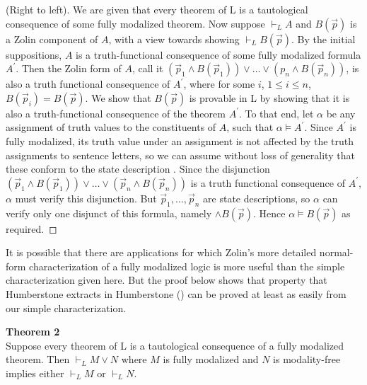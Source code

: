 \documentclass[
  10pt,
  letterpaper,
  DIV=11,
  numbers=noendperiod,
  twoside]{scrartcl}
\begin{document}
(Right to left). We are given that every theorem of L is a tautological
consequence of some fully modalized theorem. Now suppose \(\vdash_L A\)
and \(B(\vec{p})\) is a Zolin component of \(A\), with a view towards
showing \(\vdash_L B(\vec{p})\). By the initial suppositions, \(A\) is a
truth-functional consequence of some fully modalized formula
\(A^\prime\). Then the Zolin form of \(A\), call it
\((\vec{p}_1\wedge B(\vec{p}_1))\vee {\ldots}\vee (p_n\wedge B(\vec{p}_n))\),
is also a truth functional consequence of \(A^\prime\), where for some
\(i\), \(1\le i\le n\), \(B(\vec{p}_i)=B(\vec{p})\). We show that
\(B(\vec{p})\) is provable in L by showing that it is also a
truth-functional consequence of the theorem \(A^\prime\). To that end,
let \(\alpha\) be any assignment of truth values to the constituents of
\(A\), such that \(\alpha\models A^\prime\). Since \(A^\prime\) is fully
modalized, its truth value under an assignment is not affected by the
truth assignments to sentence letters, so we can assume without loss of
generality that these conform to the state description . Since the
disjunction
\((\vec{p}_1\wedge B(\vec{p}_1))\vee {\ldots}\vee (\vec{p}_n\wedge B(\vec{p}_n))\)
is a truth functional consequence of \(A^\prime\), \(\alpha\) must
verify this disjunction. But \(\vec{p}_1,{\ldots},\vec{p}_n\) are state
descriptions, so \(\alpha\) can verify only one disjunct of this
formula, namely \(\wedge B(\vec{p})\). Hence
\(\alpha\models B(\vec{p})\) as required.~◻

It is possible that there are applications for which Zolin's more
detailed normal-form characterization of a fully modalized logic is more
useful than the simple characterization given here. But the proof below
shows that property that Humberstone extracts in Humberstone
() can be proved at least as easily
from our simple characterization.

\textbf{Theorem 2}\\
Suppose every theorem of L is a tautological consequence of a fully
modalized theorem. Then \(\vdash_LM\vee N\) where \(M\) is fully
modalized and \(N\) is modality-free implies either \(\vdash_LM\) or
\(\vdash_LN\).
\end{document}
